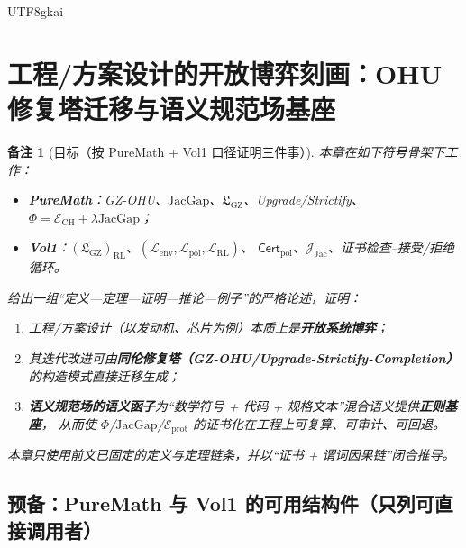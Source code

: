 \documentclass[12pt]{article}
\newtheorem{remark}{备注}[section]
\newcommand{\GZLS}{\ensuremath{\mathfrak{L}_{\mathrm{GZ}}}}
\newcommand{\JacGap}{\ensuremath{\mathrm{JacGap}}} %
\begin{document}
\begin{CJK*}{UTF8}{gkai}
\section{工程/方案设计的开放博弈刻画：OHU 修复塔迁移与语义规范场基座}
\label{sec:eng-design-open-game-ohutower-semanticfield}

\begin{remark}[目标（按 PureMath + Vol1 口径证明三件事）]
本章在如下符号骨架下工作：
\begin{itemize}
  \item \textbf{PureMath}：GZ-OHU、$\JacGap$、$\GZLS$、Upgrade/Strictify、$\Phi=\mathcal{E}_{\mathrm{CH}}+\lambda\JacGap$；
  \item \textbf{Vol1}：$(\GZLS)_{\mathrm{RL}}$、$(\mathcal{L}_{\mathrm{env}},\mathcal{L}_{\mathrm{pol}},\mathcal{L}
    _{\mathrm{RL}})$、
  $\mathsf{Cert}_{\mathrm{pol}}$、$\mathcal{J}_{\mathrm{Jac}}$、证书检查--接受/拒绝循环。
\end{itemize}
给出一组“定义—定理—证明—推论—例子”的严格论述，证明：
\begin{enumerate}
  \item 工程/方案设计（以发动机、芯片为例）本质上是\textbf{开放系统博弈}；
  \item 其迭代改进可由\textbf{同伦修复塔（GZ-OHU/Upgrade-Strictify-Completion）}的构造模式直接迁移生成；
  \item \textbf{语义规范场的语义函子}为“数学符号 + 代码 + 规格文本”混合语义提供\textbf{正则基座}，
  从而使 $\Phi$/$\JacGap$/$\mathcal{E}_{\mathrm{prot}}$ 的证书化在工程上可复算、可审计、可回退。
\end{enumerate}
本章只使用前文已固定的定义与定理链条，并以“证书 + 谓词因果链”闭合推导。
\end{remark}

\subsection{预备：PureMath 与 Vol1 的可用结构件（只列可直接调用者）}
\label{sec:eng-design-prelim}


\end{CJK*}
\end{document}
